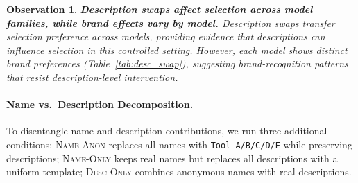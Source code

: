 \documentclass[11pt]{article}
\newtheorem{observation}{Observation}
\begin{document}
\begin{observation}
\textbf{Description swaps affect selection across model
families, while brand effects vary by model.}
Description swaps transfer selection preference across
models, providing evidence that descriptions can
influence selection in this controlled setting.
However, each model shows distinct brand preferences
(Table~\ref{tab:desc_swap}), suggesting brand-recognition
patterns that resist description-level intervention.
\end{observation}

\paragraph{Name vs.\ Description Decomposition.}
To disentangle name and description contributions,
we run three additional conditions:
\textsc{Name-Anon} replaces all names with
\texttt{Tool~A/B/C/D/E} while preserving descriptions;
\textsc{Name-Only} keeps real names but replaces all
descriptions with a uniform template;
\textsc{Desc-Only} combines anonymous names with
real descriptions.

\begin{table}[t]
\centering\small
{}
\caption{Active ablation: selection concentration under
name-anonymized, name-only, and description-only
conditions.
Description alone produces concentration in every cluster;
in most clusters,
\textsc{Name-Anon} and \textsc{Name-Only}
select \emph{different} winners, providing evidence
for independent contributions.}
\label{tab:name_ablation}
\end{table}
\end{document}
